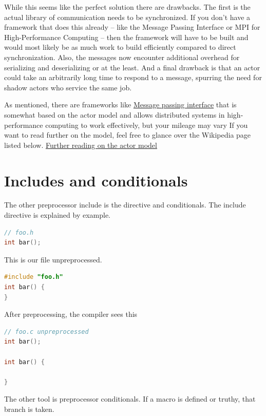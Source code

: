 While this seems like the perfect solution there are drawbacks.
The first is the actual library of communication needs to be synchronized.
If you don't have a framework that does this already -- like the Message Passing Interface or MPI for High-Performance Computing -- then the framework will have to be built and would most likely be as much work to build efficiently compared to direct synchronization.
Also, the messages now encounter additional overhead for serializing and deserializing or at the least.
And a final drawback is that an actor could take an arbitrarily long time to respond to a message, spurring the need for shadow actors who service the same job.

As mentioned, there are frameworks like \href{https://en.wikipedia.org/wiki/Message\_Passing\_Interface}{Message passing interface} that is somewhat based on the actor model and allows distributed systems in high-performance computing to work effectively, but your mileage may vary
If you want to read further on the model, feel free to glance over the Wikipedia page listed below.
\href{https://en.wikipedia.org/wiki/Actor\_model}{Further reading on the actor model}


\section{Includes and conditionals}

The other preprocessor include is the  directive and conditionals.
The include directive is explained by example.

\begin{lstlisting}[language=C]
// foo.h
int bar();
\end{lstlisting}

This is our file  unpreprocessed.

\begin{lstlisting}[language=C]
#include "foo.h"
int bar() {
}
\end{lstlisting}

After preprocessing, the compiler sees this

\begin{lstlisting}[language=C]
// foo.c unpreprocessed
int bar();

int bar() {

}
\end{lstlisting}

The other tool is \gls{preprocessor conditionals}.
If a macro is defined or truthy, that branch is taken.

